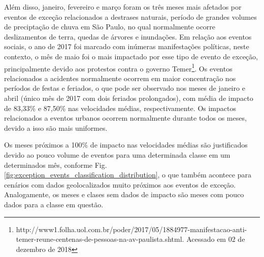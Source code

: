 \documentclass[
	12pt,				%
	oneside,			%
	a4paper,			%
	english,			%
	brazil				%
	]{abntex2ppgsi}
\begin{document}
Além disso, janeiro, fevereiro e março foram os três meses mais afetados por eventos de exceção relacionados a destrases naturais, período de grandes volumes de preciptação de chuva em São Paulo, no qual normalmente ocorre deslizamentos de terra, quedas de árvores e inundações.  Em relação aos eventos sociais, o ano de 2017 foi marcado com inúmeras manifestações políticas, neste contexto, o mês de maio foi o mais impactado por esse tipo de evento de exceção, principalmente devido aos protestos contra o governo Temer\footnote{{http://www1.folha.uol.com.br/poder/2017/05/1884977-manifestacao-anti-\newline temer-reune-centenas-de-pessoas-na-av-paulista.shtml}. Acessado em 02 de dezembro de 2018}. Os eventos relacionados a acidentes normalmente ocorrem em maior concentração nos períodos de festas e feriados, o que pode ser observado nos meses de janeiro e abril (único mês de 2017 com dois feriados prolongados), com média de impacto de 83,33\% e 87,50\% nas velocidades médias, respectivamente.  Os impactos relacionados a eventos urbanos ocorrem normalmente durante todos os meses, devido a isso são mais uniformes.

Os meses próximos a 100\% de impacto nas velocidades médias são justificados devido ao pouco volume de eventos para uma determinada classe em um determinados mês, conforme Fig. \ref{fig:exception_events_classification_distribution}, o que também acontece para cenários com dados geolocalizados muito próximos aos eventos de exceção. Analogamente, os meses e clases sem dados de impacto são meses com pouco dados para a classe em questão. 
\end{document}
